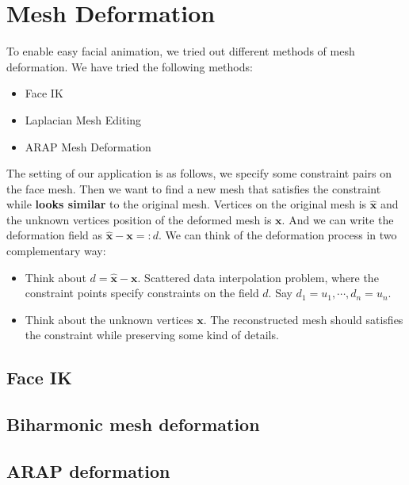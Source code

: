 \section{Mesh Deformation}
To enable easy facial animation, we tried out different methods of mesh deformation. We have tried the following methods:
\begin{itemize}
\item Face IK
\item Laplacian Mesh Editing
\item ARAP Mesh Deformation
\end{itemize}
The setting of our application is as follows, we specify some constraint pairs on the face mesh. Then we want to find a new mesh that satisfies the constraint while \textbf{looks similar} to the original mesh. Vertices on the original mesh is $\hat{\mathbf{x}}$ and the unknown vertices position of the deformed mesh is $\mathbf{x}$. And we can write the deformation field as $\hat{\mathbf{x}} - \mathbf{x} =: d$. We can think of the deformation process in two complementary way:
\begin{itemize}
\item Think about $d = \hat{\mathbf{x}} - \mathbf{x}$. Scattered data interpolation problem, where the constraint points specify constraints on the field $d$. Say $d_1 = u_1, \cdots, d_n = u_n$.
\item Think about the unknown vertices $\mathbf{x}$. The reconstructed mesh should satisfies the constraint while preserving some kind of details.
\end{itemize}

\subsection{Face IK}


\subsection{Biharmonic mesh deformation}


\subsection{ARAP deformation}


